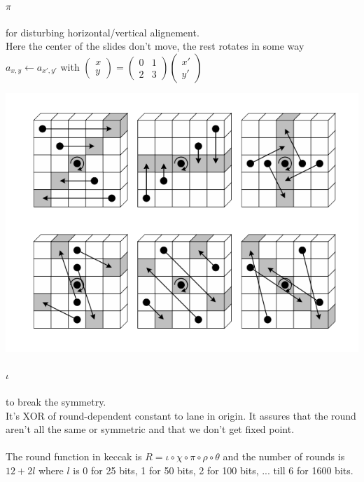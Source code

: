 \documentclass[11pt,a4paper]{report}
\begin{document}
\paragraph{$\pi$} for disturbing horizontal/vertical alignement.\\
Here the center of the slides don't  move, the rest rotates in some way\\ $a_{x,y} \leftarrow a_{x',y'}$ with $\left(\begin{array}{c}
x \\ y
\end{array}\right) = \left(\begin{array}{cc}
0&1 \\ 2&3
\end{array}\right) \left(\begin{array}{c}
x' \\ y'
\end{array}\right)$
\begin{center}
\includegraphics[scale=0.5]{img/img31.png}
\end{center}

\paragraph{$\iota$} to break the symmetry.\\
It's XOR of round-dependent constant to lane in origin. It assures that the round aren't all the same or symmetric and that we don't get fixed point.\\
\\

The round function in keccak is $R = \iota \circ \chi \circ \pi \circ \rho \circ \theta$ and the number of rounds is $12 + 2l$ where $l$ is 0 for 25 bits, 1 for 50 bits, 2 for 100 bits, ... till 6 for 1600 bits.\\
\\
\end{document}
